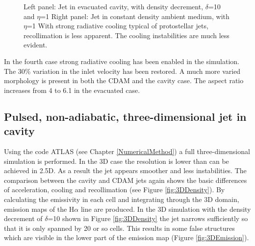\begin{figure}[t]
\begin{center}
\begin{minipage}[t]{.48\linewidth}
   \end{minipage} \hfill
\hfill
\caption{
Left panel:
Jet in evacuated cavity, with density decrement, $\delta$=10 and $\eta$=1
Right panel: 
Jet in constant density ambient medium, with $\eta$=1
With strong radiative cooling typical of protostellar jets, recollimation is less apparent.
The cooling instabilities are much less evident.
}
\label{fig:flash:cool_pulse}       %
\end{center}
\end{figure}



In the fourth case strong radiative cooling has been enabled in the simulation.
The 30\% variation in the inlet velocity has been restored.
A much more varied morphology is present in both the CDAM and the cavity case.
The aspect ratio increases from 4 to 6.1 in the evacuated case.


\subsection{Pulsed, non-adiabatic, three-dimensional jet in cavity}

Using the code ATLAS (see Chapter \ref{NumericalMethod}) a full three-dimensional simulation is performed.
In the 3D case the resolution is lower than can be achieved in 2.5D.
As a result the jet appears smoother and less instabilities.
The comparison between the cavity and CDAM jets again shows the basic differences of acceleration, cooling and recollimation (see Figure \ref{fig:3DDensity}).
By calculating the emissivity in each cell and integrating through the 3D domain, emission maps of the H$\alpha$ line are produced.
In the 3D simulation with the density decrement of $\delta$=10 shown in Figure \ref{fig:3DDensity} the jet narrows sufficiently so that it is only spanned by 20 or so cells. This results in some false structures which are visible in the lower part of the emission map (Figure \ref{fig:3DEmission}).







